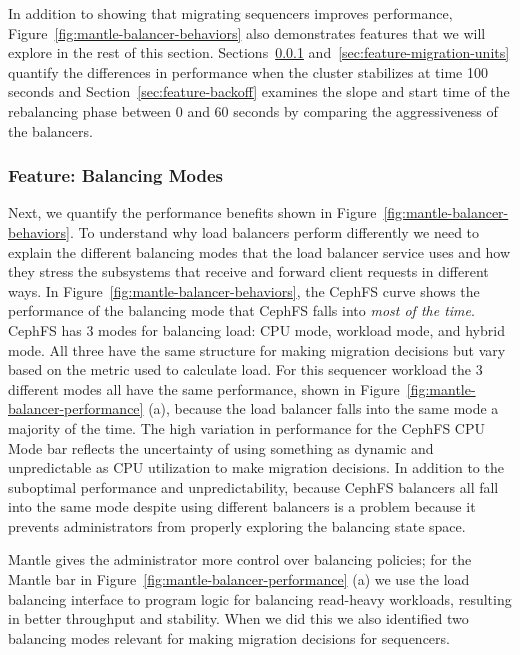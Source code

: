 \documentclass[preprint]{sigplanconf-eurosys}
\begin{document}
In addition to showing that migrating sequencers improves performance,
Figure~\ref{fig:mantle-balancer-behaviors} also demonstrates features that we
will explore in the rest of this section.
Sections~\ref{sec:feature-balancing-modes}
and~\ref{sec:feature-migration-units} quantify the differences in performance
when the cluster stabilizes at time 100 seconds and
Section~\ref{sec:feature-backoff} examines the slope and start time of the
rebalancing phase between 0 and 60 seconds by comparing the aggressiveness of
the balancers.

\subsubsection{Feature: Balancing Modes}
\label{sec:feature-balancing-modes}

Next, we quantify the performance benefits shown in
Figure~\ref{fig:mantle-balancer-behaviors}.  To understand why load balancers
perform differently we need to explain the different balancing modes that the
load balancer service uses and how they stress the subsystems that receive and
forward client requests in different ways. In
Figure~\ref{fig:mantle-balancer-behaviors}, the CephFS curve shows the
performance of the balancing mode that CephFS falls into {\it most of the time}.
CephFS has 3 modes for balancing load: CPU mode, workload mode, and hybrid
mode. All three have the same structure for making migration decisions but vary
based on the metric used to calculate load. For this sequencer workload the 3
different modes all have the same performance, shown in
Figure~\ref{fig:mantle-balancer-performance} (a), because the load balancer falls
into the same mode a majority of the time.  The high variation in performance
for the CephFS CPU Mode bar reflects the uncertainty of using something as
dynamic and unpredictable as CPU utilization to make migration decisions. In
addition to the suboptimal performance and unpredictability, because
CephFS balancers all fall into the same mode despite using different balancers
is a problem because it prevents administrators from properly exploring the
balancing state space.

Mantle gives the administrator more control over balancing policies; for
the Mantle bar in Figure~\ref{fig:mantle-balancer-performance} (a) we use the load
balancing interface to program logic for balancing read-heavy workloads,
resulting in better throughput and stability.  When we did this we also
identified two balancing modes relevant for making migration decisions
for sequencers. 
\end{document}
